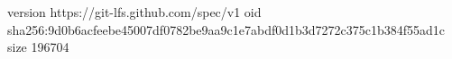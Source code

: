 version https://git-lfs.github.com/spec/v1
oid sha256:9d0b6acfeebe45007df0782be9aa9c1e7abdf0d1b3d7272c375c1b384f55ad1c
size 196704
